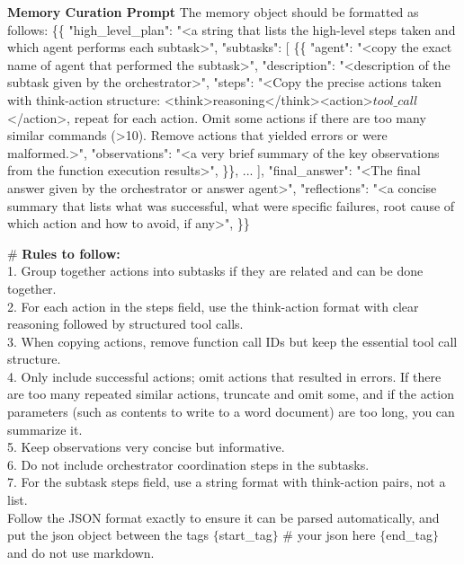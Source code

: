 \begin{Prompt}{\textbf{Memory Curation Prompt}}{}
The memory object should be formatted as follows:
\{\{
    "high\_level\_plan": "<a string that lists the high-level steps taken and which agent performs each subtask>",
    "subtasks": [
        \{\{
            "agent": "<copy the exact name of agent that performed the subtask>",
            "description": "<description of the subtask given by the orchestrator>",
            "steps": "<Copy the precise actions taken with think-action structure: <think>reasoning</think><action>${{tool\_call}}$</action>, repeat for each action. Omit some actions if there are too many similar commands (>10). Remove actions that yielded errors or were malformed.>",
            "observations": "<a very brief summary of the key observations from the function execution results>",
        \}\},
        ...
    ],
    "final\_answer": "<The final answer given by the orchestrator or answer agent>",
    "reflections": "<a concise summary that lists what was successful, what were specific failures, root cause of which action and how to avoid, if any>",
\}\}

\# \textbf{Rules to follow:}\\
1. Group together actions into subtasks if they are related and can be done together.\\
2. For each action in the steps field, use the think-action format with clear reasoning followed by structured tool calls.\\
3. When copying actions, remove function call IDs but keep the essential tool call structure.\\
4. Only include successful actions; omit actions that resulted in errors. If there are too many repeated similar actions, truncate and omit some, and if the action parameters (such as contents to write to a word document) are too long, you can summarize it.\\
5. Keep observations very concise but informative.\\
6. Do not include orchestrator coordination steps in the subtasks.\\
7. For the subtask steps field, use a string format with think-action pairs, not a list.\\

Follow the JSON format exactly to ensure it can be parsed automatically, and put the json object between the tags $\{$start\_tag$\}$
\# your json here
$\{$end\_tag$\}$ and do not use markdown.

\end{Prompt}

